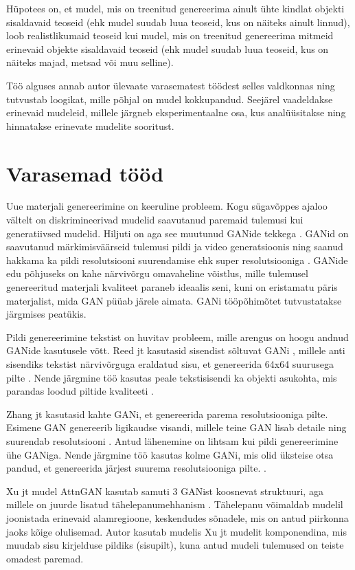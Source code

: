 \documentclass{vilgym}
\begin{document}
	Hüpotees on, et mudel, mis on treenitud genereerima ainult ühte kindlat objekti sisaldavaid teoseid (ehk mudel suudab luua teoseid, kus on näiteks ainult linnud), loob realistlikumaid teoseid kui mudel, mis on treenitud genereerima mitmeid erinevaid objekte sisaldavaid teoseid (ehk mudel suudab luua teoseid, kus on näiteks majad, metsad või muu selline).

	Töö alguses annab autor ülevaate varasematest töödest selles valdkonnas ning tutvustab loogikat, mille põhjal on mudel kokkupandud. Seejärel vaadeldakse erinevaid mudeleid, millele järgneb eksperimentaalne osa, kus analüüsitakse ning hinnatakse erinevate mudelite sooritust. 
	
	\section{Varasemad tööd}

	Uue materjali genereerimine on keeruline probleem. Kogu sügavõppes ajaloo vältelt on diskrimineerivad mudelid saavutanud paremaid tulemusi kui generatiivsed mudelid. Hiljuti on aga see muutunud GANide tekkega \parencite{gan}. GANid on saavutanud märkimisväärseid tulemusi pildi \parencite{biggan} ja video generatsioonis \parencite{dvdgan} ning saanud hakkama ka pildi resolutsiooni suurendamise ehk super resolutsiooniga \parencite{srgan}. GANide edu põhjuseks on kahe närvivõrgu omavaheline võistlus, mille tulemusel genereeritud materjali kvaliteet paraneb ideaalis seni, kuni on eristamatu päris materjalist, mida GAN püüab järele aimata. GANi tööpõhimõtet tutvustatakse järgmises peatükis.

	Pildi genereerimine tekstist on huvitav probleem, mille arengus on hoogu andnud GANide kasutusele võtt. Reed jt kasutasid sisendist sõltuvat GANi , millele anti sisendiks tekstist närvivõrguga eraldatud sisu, et genereerida 64x64 suurusega pilte \parencite{reed}. Nende järgmine töö kasutas peale tekstisisendi ka objekti asukohta, mis parandas loodud piltide kvaliteeti \parencite{reed2}. 

	Zhang jt kasutasid kahte GANi, et genereerida parema resolutsiooniga pilte. Esimene GAN genereerib ligikaudse visandi, millele teine GAN lisab detaile ning suurendab resolutsiooni \parencite{stackgan}. Antud lähenemine on lihtsam kui pildi genereerimine ühe GANiga. Nende järgmine töö kasutas kolme GANi, mis olid üksteise otsa pandud, et genereerida järjest suurema resolutsiooniga pilte. \parencite{stackgan2}.

	Xu jt mudel AttnGAN kasutab samuti 3 GANist koosnevat struktuuri, aga millele on juurde lisatud tähelepanumehhanism \parencite{attngan}. Tähelepanu võimaldab mudelil joonistada erinevaid alamregioone, keskendudes sõnadele, mis on antud piirkonna jaoks kõige olulisemad. Autor kasutab mudelis Xu jt mudelit komponendina, mis muudab sisu kirjelduse pildiks (sisu\textrightarrow pilt), kuna antud mudeli tulemused on teiste omadest paremad. 
\end{document}
